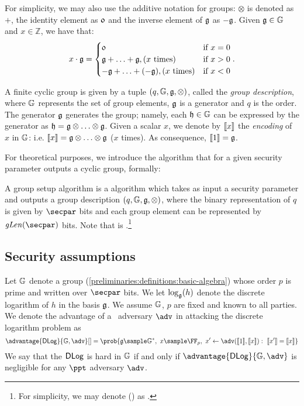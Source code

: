 For simplicity, we may also use the additive notation for groups: $\otimes$ is denoted as $+$, the identity element as $\mathfrak{0}$ and the inverse element of $\mathfrak{g}$ as $-\mathfrak{g}$. Given $\mathfrak{g} \in \mathbb{G}$ and $x \in \mathbb{Z}$, we have that:
\[x \cdot \mathfrak{g} =
\begin{cases}
    \mathfrak{0} & \mbox{if } x = 0\\
    \mathfrak{g} + \ldots + \mathfrak{g}, (x \mbox{ times}) & \mbox{if } x > 0 \\
    -\mathfrak{g} + \ldots + (-\mathfrak{g}), (x \mbox{ times}) & \mbox{if } x < 0
\end{cases}.
\]
\begin{definition}
    A finite cyclic group is given by a tuple $(q, \mathbb{G}, \mathfrak{g}, \otimes)$, called the \emph{group description}, where $\mathbb{G}$ represents the set of group elements, $\mathfrak{g}$ is a generator and $q$ is the order. The generator $\mathfrak{g}$ generates the group; namely, each $\mathfrak{h} \in \mathbb{G}$ can be expressed by the generator as $\mathfrak{h} = \mathfrak{g} \otimes \ldots \otimes \mathfrak{g} $.
    Given a scalar $x$, we denote by $\llbracket {x} \rrbracket$ the \emph{encoding} of $x$ in $\mathbb{G}$: i.e. $\llbracket {x} \rrbracket = \mathfrak{g} \otimes \ldots \otimes \mathfrak{g}$ ($x$ times). As consequence, $\llbracket {1} \rrbracket = \mathfrak{g}$.
\end{definition}

For theoretical purposes, we introduce the \groupSetup{} algorithm that for a given security parameter \secpar{} outputs a cyclic group, formally:
\begin{definition}
    A group setup algorithm \groupSetup{} is a \ppt{} algorithm which takes as input a security parameter \secparam{} and outputs a group description $(q, \mathbb{G}, \mathfrak{g}, \otimes)$, where the binary representation of $q$ is given by $\secpar$ bits and each group element can be represented by $\groupLen(\secpar)$ bits. Note that \groupLen{} is \poly.\footnote{For simplicity, we may denote \groupLen(\secpar) as \groupLen{}.}
\end{definition}


\subsection{Security assumptions}\label{preliminaries:sec-assumptions}
\begin{definition}
Let $\mathbb{G}$ denote a group (\cref{preliminaries:definitions:basic-algebra}) whose order $p$ is prime and written over $\secpar$ bits. We let $\log_{\mathfrak{g}}(h)$ denote the discrete logarithm of $h$ in the basis $\mathfrak{g}$. We assume $\mathbb{G}$, $p$ are fixed and known to all parties.
We denote the advantage of a \ppt~adversary $\adv$ in attacking the discrete logarithm problem as
\[
    \advantage{\dlog}{\gset, \adv}[] = \prob{\ggen \sample \gset^{*},\ x \sample \FFx{p},\ x' \gets \adv(\groupenc{1}, \groupenc{x}):\ \groupenc{x'}{} = \groupenc{x}}
\]
We say that the $\mathsf{DLog}$ is hard in $\mathbb{G}$ if and only if $\advantage{\dlog}{\gset, \adv}$ is negligible for any $\ppt$ adversary $\adv$.
\end{definition}

